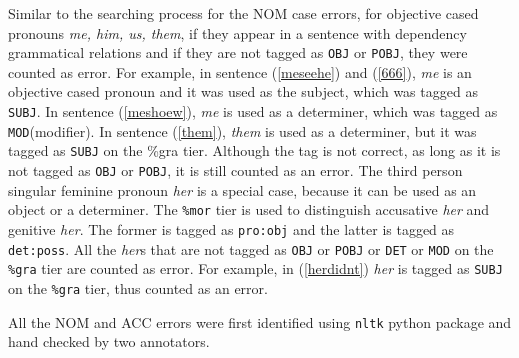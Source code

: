 Similar to the searching process for the NOM case errors, for objective cased pronouns \textit{me, him, us, them}, if they appear in a sentence with dependency grammatical relations and if they are not tagged as \texttt{OBJ} or \texttt{POBJ}, they were counted as error. For example, in sentence (\ref{meseehe}) and (\ref{666}), \textit{me} is an objective cased pronoun and it was used as the subject, which was tagged as \texttt{SUBJ}. In sentence (\ref{meshoew}), \textit{me} is used as a determiner, which was tagged as \texttt{MOD}(modifier). In sentence (\ref{them}), \textit{them} is used as a determiner, but it was tagged as \texttt{SUBJ} on the \%gra tier. Although the tag is not correct, as long as it is not tagged as \texttt{OBJ} or \texttt{POBJ}, it is still counted as an error. The third person singular feminine pronoun \textit{her} is a special case, because it can be used as an object or a determiner. The \texttt{\%mor} tier is used to distinguish accusative \textit{her} and genitive \textit{her}. The former is tagged as \texttt{pro:obj} and the latter is tagged as \texttt{det:poss}. All the \textit{her}s that are not tagged as \texttt{OBJ} or \texttt{POBJ} or \texttt{DET} or \texttt{MOD} on the \texttt{\%gra} tier are counted as error. For example, in (\ref{herdidnt}) \textit{her} is tagged as \texttt{SUBJ} on the \texttt{\%gra} tier, thus counted as an error. 

All the NOM and ACC errors were first identified using \texttt{nltk} python package and hand checked by two annotators. 

